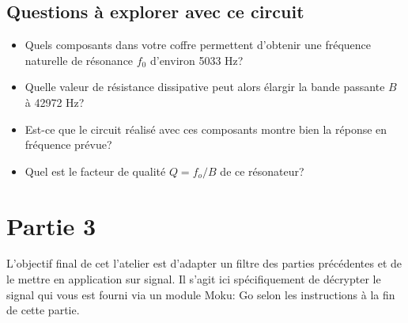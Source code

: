 \documentclass[canadien,12pt,oneside,letterpaper]{article}
\begin{document}
\subsection{Questions à explorer avec ce circuit}
\begin{itemize}
    \item Quels composants dans votre coffre permettent d'obtenir une fréquence naturelle de résonance $f_0$ d'environ 5033 Hz? %
    \item Quelle valeur de résistance dissipative peut alors élargir la bande passante $B$ à 42972 Hz? %
    \item Est-ce que le circuit réalisé avec ces composants montre bien la réponse en fréquence prévue? %
    \item Quel est le facteur de qualité $Q=f_o/B$ de ce résonateur? %
\end{itemize}

\section{Partie 3}\label{sec:filtrage-source}
 L'objectif final de cet l'atelier est d'adapter un filtre des parties précédentes et de le mettre en application sur signal. Il s'agit ici spécifiquement de décrypter le signal qui vous est fourni via un module Moku: Go selon les instructions à la fin de cette partie.
\end{document}
